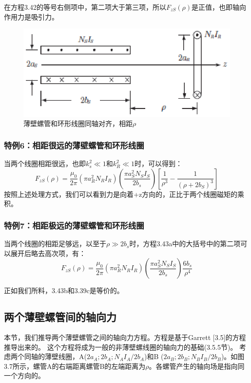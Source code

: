 在方程3.42的等号右侧项中，第二项大于第三项，所以$F_{zS}(\rho)$是正值，也即轴向作用力是吸引力。
\begin{figure}[htbp]
	\centering
	\includegraphics[scale=0.9]{chpt3/figs/fig3.6.eps}
	\caption{薄壁螺管和环形线圈同轴对齐，相距$\rho$}
\end{figure}

\subsubsection{特例6：相距很远的薄壁螺管和环形线圈}
当两个线圈相距很远，也即$k_s^2\ll 1$和$k_R^2\ll 1$时，可以得到：
\begin{equation}
F_{zS}(\rho)=\frac{\mu_0}{2\pi}(\pi a_R^2N_R I_R)(\frac{\pi a_S^2 N_S I_S}{2 b_s})[\frac{1}{\rho^3}-\frac{1}{(\rho+2b_S)^3}]
\end{equation}
按照上述处理方式，我们可以看到力是向着+z方向的，正比于两个线圈磁矩的乘积。

\subsubsection{特例7：相距极远的薄壁螺管和环形线圈}
当两个线圈的相距足够远，以至于$\rho \gg 2b_s$时，方程3.43a中的大括号中的第二项可以展开后略去高次项，有：
\begin{equation}
F_{zS}(\rho)=\frac{\mu_0}{2\pi}(\pi a_R^2 N_R I_R)(\frac{\pi a_S^2 N_S I_S}{2 b_s})\frac{6b_s}{\rho^4}
\end{equation}

正如我们所料，3.43b和3.39c是等价的。
\subsection{两个薄壁螺管间的轴向力}
本节，我们推导两个薄壁螺管之间的轴向力方程。方程是基于Garrett [3.5]的方程推导出来的。
这个方程将成为一般的非薄壁螺线圈的轴向力的基础(3.5.5节)。
考虑两个同轴的薄壁线圈，A($2a_A; 2b_A; N_A I_A/2b_A$)和B ($2a_B; 2b_B;
N_B I_B/2b_B$)。如图3.7所示，螺管A的右端距离螺管B的左端距离为$\rho$。各螺管产生的轴向场是指向同一个方向的。
